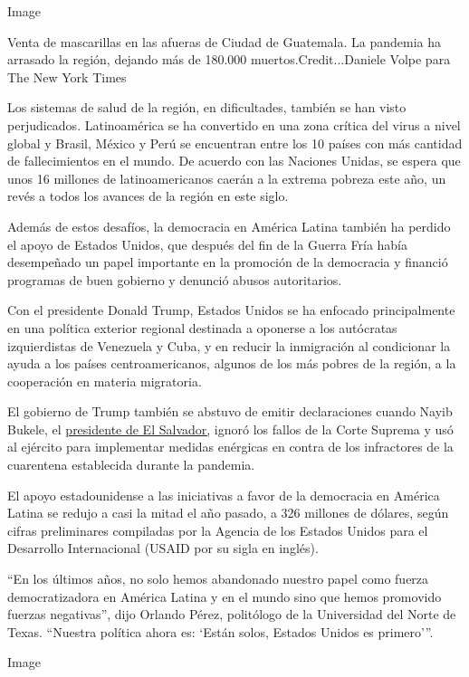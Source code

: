 Image

Venta de mascarillas en las afueras de Ciudad de Guatemala. La pandemia
ha arrasado la región, dejando más de 180.000 muertos.Credit...Daniele
Volpe para The New York Times

Los sistemas de salud de la región, en dificultades, también se han
visto perjudicados. Latinoamérica se ha convertido en una zona crítica
del virus a nivel global y Brasil, México y Perú se encuentran entre los
10 países con más cantidad de fallecimientos en el mundo. De acuerdo con
las Naciones Unidas, se espera que unos 16 millones de latinoamericanos
caerán a la extrema pobreza este año, un revés a todos los avances de la
región en este siglo.

Además de estos desafíos, la democracia en América Latina también ha
perdido el apoyo de Estados Unidos, que después del fin de la Guerra
Fría había desempeñado un papel importante en la promoción de la
democracia y financió programas de buen gobierno y denunció abusos
autoritarios.

Con el presidente Donald Trump, Estados Unidos se ha enfocado
principalmente en una política exterior regional destinada a oponerse a
los autócratas izquierdistas de Venezuela y Cuba, y en reducir la
inmigración al condicionar la ayuda a los países centroamericanos,
algunos de los más pobres de la región, a la cooperación en materia
migratoria.

El gobierno de Trump también se abstuvo de emitir declaraciones cuando
Nayib Bukele, el
\href{https://www.nytimes3xbfgragh.onion/es/2020/05/06/espanol/america-latina/bukele-el-salvador-virus.html}{presidente
de El Salvador,} ignoró los fallos de la Corte Suprema y usó al ejército
para implementar medidas enérgicas en contra de los infractores de la
cuarentena establecida durante la pandemia.

El apoyo estadounidense a las iniciativas a favor de la democracia en
América Latina se redujo a casi la mitad el año pasado, a 326 millones
de dólares, según cifras preliminares compiladas por la Agencia de los
Estados Unidos para el Desarrollo Internacional (USAID por su sigla en
inglés).

``En los últimos años, no solo hemos abandonado nuestro papel como
fuerza democratizadora en América Latina y en el mundo sino que hemos
promovido fuerzas negativas'', dijo Orlando Pérez, politólogo de la
Universidad del Norte de Texas. ``Nuestra política ahora es: `Están
solos, Estados Unidos es primero'''.

Image

